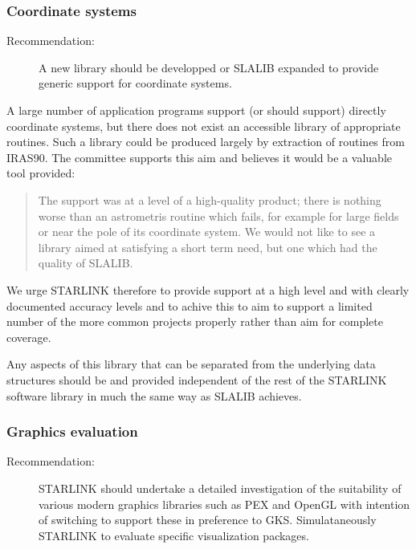 \subsubsection{Coordinate systems}

\begin{description}
\item[Recommendation:] A new library should be developped or SLALIB expanded to
provide generic support for coordinate systems.
\end{description}

A large number of application programs support (or should support)
directly coordinate systems, but there does not exist an accessible
library of appropriate routines.  Such a library could be produced
largely by extraction of routines from IRAS90.  The committee supports
this aim and believes it would be a valuable tool provided:

\begin{quote}
The support was at a level of a high-quality product; there is nothing
worse than an astrometris routine which fails, for example for large
fields or near the pole of its coordinate system.  We would not like
to see a library aimed at satisfying a short term need, but one which
had the quality of SLALIB.
\end{quote}

We urge STARLINK therefore to provide support at a high level and with
clearly documented accuracy levels and to achive this to aim to
support a limited number of the more common projects properly rather
than aim for complete coverage.

Any aspects of this library that can be separated from the underlying
data structures should be and provided independent of the rest of the
STARLINK software library in much the same way as SLALIB achieves.

\subsubsection{Graphics evaluation}

\begin{description}
\item[Recommendation:] STARLINK should undertake a detailed investigation of
the suitability of various modern graphics libraries such as PEX and
OpenGL with intention of switching to support these in preference to
GKS.  Simulataneously STARLINK to evaluate specific visualization
packages.
\end{description}

